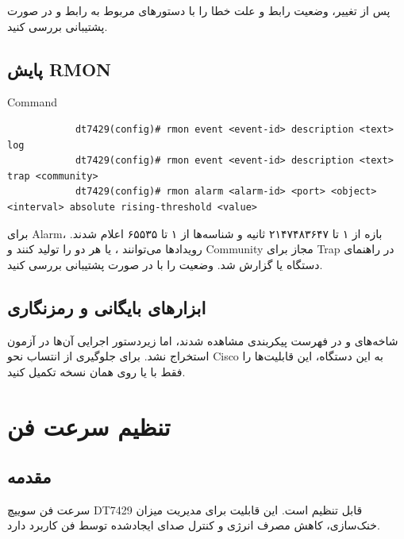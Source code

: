 \documentclass[11pt,letterpaper]{report}
\begin{document}
	پس از تغییر، وضعیت رابط و علت خطا را با دستورهای  مربوط
	به رابط و  در صورت پشتیبانی بررسی کنید.

	\section{پایش RMON}

	\begin{LTR}
		\begin{cliexample}{Command}
			\begin{verbatim}
			dt7429(config)# rmon event <event-id> description <text> log
			dt7429(config)# rmon event <event-id> description <text> trap <community>
			dt7429(config)# rmon alarm <alarm-id> <port> <object> <interval> absolute rising-threshold <value>
			\end{verbatim}
		\end{cliexample}
	\end{LTR}

	برای Alarm، بازه  از ۱ تا ۲۱۴۷۴۸۳۶۴۷ ثانیه و شناسه‌ها
	از ۱ تا ۶۵۵۳۵ اعلام شدند. رویدادها می‌توانند ،  یا
	هر دو را تولید کنند و Community مجاز برای Trap در راهنمای دستگاه
	 یا  گزارش شد. وضعیت را با 
	در صورت پشتیبانی بررسی کنید.

	\section{ابزارهای بایگانی و رمزنگاری}

	شاخه‌های  و  در فهرست پیکربندی مشاهده شدند،
	اما زیر‌دستور اجرایی آن‌ها در آزمون استخراج نشد. برای جلوگیری از
	انتساب نحو Cisco به این دستگاه، این قابلیت‌ها را فقط با
	 یا  روی همان نسخه تکمیل کنید.



	\chapter{تنظیم سرعت فن}

	\section{مقدمه}

	سرعت فن سوییچ DT7429 قابل تنظیم است. این قابلیت برای مدیریت میزان
	خنک‌سازی، کاهش مصرف انرژی و کنترل صدای ایجادشده توسط فن کاربرد دارد.
\end{document}
